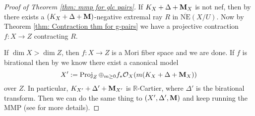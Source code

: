 \documentclass[11pt]{amsart}
\numberwithin{equation}{section}
\newcommand{\Mm}{{\bf{M}}}
\newcommand{\Rr}{\mathbb{R}}
\newcommand{\proj}{\operatorname{Proj}}
\newcommand{\Oo}{\mathcal{O}}
\newcommand{\NE}{\mathrm{NE}}
\theoremstyle{definition}
\theoremstyle{definition}
\theoremstyle{definition}
\begin{document}
\begin{proof}[Proof of Theorem \ref{thm: mmp for glc pairs}]
If $K_X+\Delta+\Mm_X$ is not nef, then by \cite[Theorem 1.3]{HL21a} there exists a $(K_X+\Delta+\Mm)$-negative extremal ray $R$ in $\overline{\NE}(X/U)$. Now by Theorem \ref{thm: Contraction thm for g-pairs} we have a projective contraction $f:X\to Z$ contracting $R$. 

If $\dim X>\dim Z$, then $f:X\to Z$ is a Mori fiber space and we are done. If $f$ is birational then by \cite[Theorem 1.1]{LX22b} we know there exist a canonical model 
$$
X':=\proj_{Z}\oplus_{m\ge0}f_*\Oo_{X}(m(K_X+\Delta+\Mm_X))
$$
over $Z$. In particular, $K_{X'}+\Delta'+\Mm_{X'}$ is $\Rr$-Cartier, where $\Delta'$ is the birational transform. Then we can do the same thing to $(X',\Delta',\Mm)$ and keep running the MMP (see \cite[Section 4.9]{Fuj17} for more details).



\end{proof}
\end{document}
